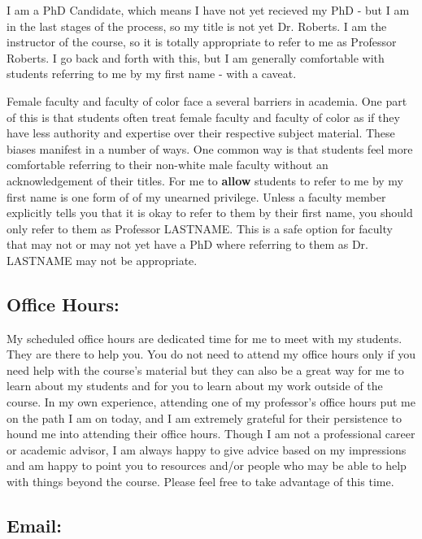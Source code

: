\documentclass[11pt, a4paper]{article}
\begin{document}
I am a PhD Candidate, which means I have not yet recieved my PhD - but I am in the last stages of the process, so my title is not yet Dr. Roberts. I am the instructor of the course, so it is totally appropriate to refer to me as Professor Roberts. I go back and forth with this, but I am generally comfortable with students referring to me by my first name - with a caveat.

Female faculty and faculty of color face a several barriers in academia. One part of this is that students often treat female faculty and faculty of color as if they have less authority and expertise over their respective subject material. These biases manifest in a number of ways. One common way is that students feel more comfortable referring to their non-white male faculty without an acknowledgement of their titles. For me to \textbf{allow} students to refer to me by my first name is one form of of my unearned privilege. Unless a faculty member explicitly tells you that it is okay to refer to them by their first name, you should only refer to them as Professor LASTNAME. This is a safe option for faculty that may not or may not yet have a PhD where referring to them as Dr. LASTNAME may not be appropriate.

\subsection*{Office Hours:} 

My scheduled office hours are dedicated time for me to meet with my students. They are there to help you. You do not need to attend my office hours only if you need help with the course's material but they can also be a great way for me to learn about my students and for you to learn about my work outside of the course. In my own experience, attending one of my professor's office hours put me on the path I am on today, and I am extremely grateful for their persistence to hound me into attending their office hours. Though I am not a professional career or academic advisor, I am always happy to give advice based on my impressions and am happy to point you to resources and/or people who may be able to help with things beyond the course. Please feel free to take advantage of this time.

\subsection*{Email:}
\end{document}
